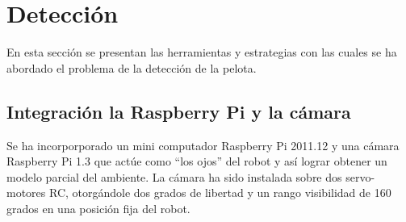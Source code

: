 \documentclass[tikz,conference, letterpaper]{IEEEtranMC1}
\begin{document}
%
%
%
%        


\section{Detección}
\label{sec:deteccion}


En esta sección se presentan las herramientas y estrategias con las cuales se ha abordado el problema de la detección de la pelota.

\subsection{Integración la Raspberry Pi y la cámara}
Se ha incorporporado un mini computador Raspberry Pi 2011.12 y una cámara Raspberry Pi 1.3 que actúe como “los ojos” del robot y así lograr obtener un modelo parcial del ambiente. La cámara ha sido instalada sobre dos servo-motores RC, otorgándole dos grados de libertad y un rango visibilidad de 160 grados en una posición fija del robot.
\end{document}
